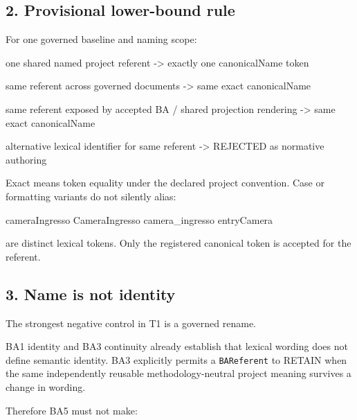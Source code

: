 \documentclass[
  10pt,
  a4paper,
]{article}
\newenvironment{Shaded}{}{}
\newcommand{\NormalTok}[1]{#1}
\begin{document}
\subsection{2. Provisional lower-bound
rule}\label{provisional-lower-bound-rule}

For one governed baseline and naming scope:

\begin{Shaded}
\begin{Highlighting}[]
\NormalTok{one shared named project referent}
\NormalTok{    {-}\textgreater{} exactly one canonicalName token}

\NormalTok{same referent across governed documents}
\NormalTok{    {-}\textgreater{} same exact canonicalName}

\NormalTok{same referent exposed by accepted BA / shared projection rendering}
\NormalTok{    {-}\textgreater{} same exact canonicalName}

\NormalTok{alternative lexical identifier for same referent}
\NormalTok{    {-}\textgreater{} REJECTED as normative authoring}
\end{Highlighting}
\end{Shaded}

Exact means token equality under the declared project convention. Case
or formatting variants do not silently alias:

\begin{Shaded}
\begin{Highlighting}[]
\NormalTok{cameraIngresso}
\NormalTok{CameraIngresso}
\NormalTok{camera\_ingresso}
\NormalTok{entryCamera}
\end{Highlighting}
\end{Shaded}

are distinct lexical tokens. Only the registered canonical token is
accepted for the referent.

\subsection{3. Name is not identity}\label{name-is-not-identity}

The strongest negative control in T1 is a governed rename.

BA1 identity and BA3 continuity already establish that lexical wording
does not define semantic identity. BA3 explicitly permits a
\texttt{BAReferent} to RETAIN when the same independently reusable
methodology-neutral project meaning survives a change in wording.

Therefore BA5 must not make:
\end{document}
